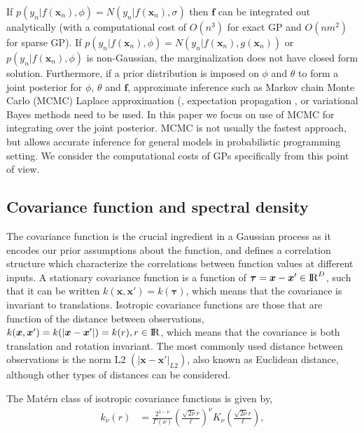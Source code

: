 \documentclass[]{interact}
\theoremstyle{plain}%
\theoremstyle{definition}
\theoremstyle{remark}
\begin{document}
If $p(y_n|f(\bm{x}_n),\phi)=N(y_n|f(\bm{x}_n),\sigma)$ then $\bm{f}$ can be integrated out analytically (with a computational cost of $O(n^3)$ for exact GP and $O(nm^2)$ for sparse GP). If $p(y_n|f(\bm{x}_n),\phi)=N(y_n|f(\bm{x}_n),g(\bm{x}_n))$ or $p(y_n|f(\bm{x}_n),\phi)$ is non-Gaussian, the marginalization does not have closed form solution.
%
Furthermore, if a prior distribution is imposed on $\phi$ and $\theta$ to form a joint posterior for $\phi$, $\theta$ and $\bm{f}$,
approximate inference such as Markov chain Monte Carlo (MCMC) \citep{brooks_2011} Laplace approximation (\citep{williams1998bayesian,rasmussen2006gaussian}, expectation propagation \citep{minka2001expectation}, or variational Bayes methods \citep{gibbs2000variational,csato2000efficient} need to be used.
%
In this paper we focus on use of MCMC for integrating over the joint
posterior. MCMC is not usually the fastest approach, but allows
accurate inference for general models in probabilistic programming
setting. We consider the computational costs of GPs specifically from
this point of view.

\subsection{Covariance function and spectral density}

The covariance function is the crucial ingredient in a Gaussian process as it encodes our prior assumptions about the function, and defines a correlation structure which characterize the correlations between function values at different inputs. A stationary covariance function is a function of $\bm{\tau}=\bm{x}-\bm{x}' \in {\rm I\!R}^D$, such that it can be written $k(\bm{x},\bm{x}') = k(\bm{\tau})$, which means that the covariance is invariant to translations. Isotropic covariance functions are those that are function of the distance between observations, $k(\bm{x},\bm{x}') = k(|\bm{x}-\bm{x}'|) = k(r), r\in {\rm I\!R}$, which means that the covariance is both translation and rotation invariant. The most commonly used distance between observations is the norm L2 $(|\bm{x}-\bm{x}'|_{L2})$, also known as Euclidean distance, although other types of distances can be considered. 

The Mat\'ern class of isotropic covariance functions is given by, 
%
\begin{align*}
k_{\nu}(r)&=\frac{2^{1-\nu}}{\Gamma(\nu)}\left(\frac{\sqrt{2\nu}r}{\ell}\right)^{\nu}K_{\nu}\left(\frac{\sqrt{2\nu}r}{\ell}\right),
\end{align*}
\end{document}
